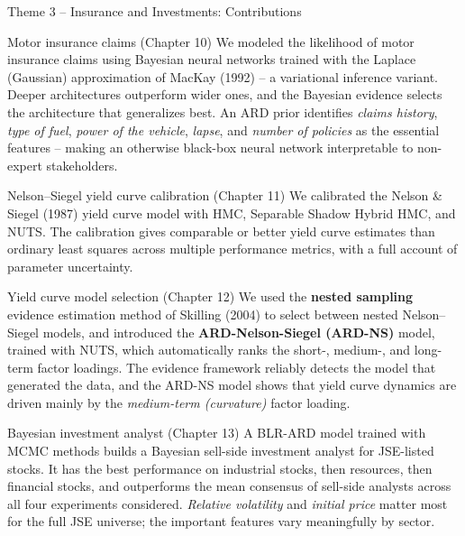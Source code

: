\documentclass[aspectratio=169,10pt]{beamer}
\begin{document}
\begin{frame}[allowframebreaks]{Theme 3 -- Insurance and Investments: Contributions}
  \begin{block}{Motor insurance claims (Chapter 10)}
    We modeled the likelihood of motor insurance claims using Bayesian
    neural networks trained with the Laplace (Gaussian) approximation of
    MacKay (1992) -- a variational inference variant. Deeper
    architectures outperform wider ones, and the Bayesian evidence
    selects the architecture that generalizes best. An ARD prior
    identifies \emph{claims history}, \emph{type of fuel}, \emph{power of
    the vehicle}, \emph{lapse}, and \emph{number of policies} as the
    essential features -- making an otherwise black-box neural network
    interpretable to non-expert stakeholders.
  \end{block}
  \begin{block}{Nelson--Siegel yield curve calibration (Chapter 11)}
    We calibrated the Nelson \& Siegel (1987) yield curve model with HMC,
    Separable Shadow Hybrid HMC, and NUTS. The calibration gives
    comparable or better yield curve estimates than ordinary least
    squares across multiple performance metrics, with a full account of
    parameter uncertainty.
  \end{block}

  \framebreak

  \begin{block}{Yield curve model selection (Chapter 12)}
    We used the \textbf{nested sampling} evidence estimation method of
    Skilling (2004) to select between nested Nelson--Siegel models, and
    introduced the \textbf{ARD-Nelson-Siegel (ARD-NS)} model, trained
    with NUTS, which automatically ranks the short-, medium-, and
    long-term factor loadings. The evidence framework reliably detects
    the model that generated the data, and the ARD-NS model shows that
    yield curve dynamics are driven mainly by the \emph{medium-term
    (curvature)} factor loading.
  \end{block}
  \begin{block}{Bayesian investment analyst (Chapter 13)}
    A BLR-ARD model trained with MCMC methods builds a Bayesian
    sell-side investment analyst for JSE-listed stocks. It has the best
    performance on industrial stocks, then resources, then financial
    stocks, and outperforms the mean consensus of sell-side analysts
    across all four experiments considered. \emph{Relative volatility}
    and \emph{initial price} matter most for the full JSE universe; the
    important features vary meaningfully by sector.
  \end{block}


\end{frame}
\end{document}
